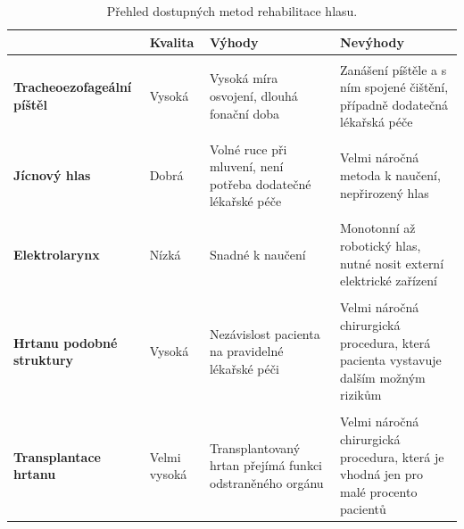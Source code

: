 \newcolumntype{b}{X}

\begin{table}[ht]
  \centering
  \begin{tabularx}{1.0\textwidth}{L{1.2} L{0.6} L{1.1} L{1.1}}
    & \textbf{Kvalita} & \textbf{Výhody} & \textbf{Nevýhody} \\
    \toprule \\ [-1.75ex]

    \textbf{Tracheoezofageální píštěl} & Vysoká & Vysoká míra osvojení, dlouhá fonační doba & Zanášení píštěle a s ním spojené čištění, případně dodatečná lékařská péče \\
    \midrule \\ [-1.75ex]

    \textbf{Jícnový hlas} & Dobrá & Volné ruce při mluvení, není potřeba dodatečné lékařské péče & Velmi náročná metoda k naučení, nepřirozený hlas \\
    \midrule \\ [-1.75ex]

    \textbf{Elektrolarynx} & Nízká & Snadné k naučení & Monotonní až robotický hlas, nutné nosit externí elektrické zařízení \\
    \midrule \\ [-1.75ex]

    \textbf{Hrtanu podobné struktury} & Vysoká & Nezávislost pacienta na pravidelné lékařské péči & Velmi náročná chirurgická procedura, která pacienta vystavuje dalším možným rizikům  \\
    \midrule \\ [-1.75ex]

    \textbf{Transplantace hrtanu} & Velmi vysoká & Transplantovaný hrtan přejímá funkci odstraněného orgánu & Velmi náročná chirurgická procedura, která je vhodná jen pro malé procento pacientů \\
  \end{tabularx}

  \caption{Přehled dostupných metod rehabilitace hlasu. \label{tab:treatment:summary}}
\end{table}

